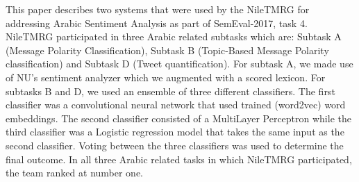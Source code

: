 This paper describes two systems that were used by the NileTMRG for addressing Arabic Sentiment Analysis as part of SemEval-2017, task 4. NileTMRG participated in three Arabic related subtasks which are: Subtask A (Message Polarity Classification), Subtask B (Topic-Based Message Polarity classification) and Subtask D  (Tweet quantification). For subtask A, we made use of NU's sentiment analyzer which we augmented with a scored lexicon. For subtasks B and D, we used an ensemble of  three different classifiers. The first classifier was a convolutional neural network that used trained (word2vec) word embeddings. The second classifier consisted of a  MultiLayer Perceptron  while the third classifier was a Logistic regression model that takes the same input as the second classifier. Voting between the three classifiers was used to determine the final outcome.  In all three Arabic related tasks in which NileTMRG participated, the team ranked at number one.
